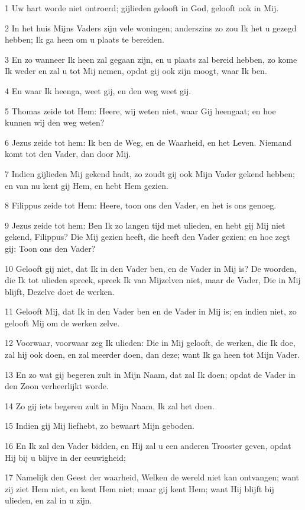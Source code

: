 \par 1 Uw hart worde niet ontroerd; gijlieden gelooft in God, gelooft ook in Mij.
\par 2 In het huis Mijns Vaders zijn vele woningen; anderszins zo zou Ik het u gezegd hebben; Ik ga heen om u plaats te bereiden.
\par 3 En zo wanneer Ik heen zal gegaan zijn, en u plaats zal bereid hebben, zo kome Ik weder en zal u tot Mij nemen, opdat gij ook zijn moogt, waar Ik ben.
\par 4 En waar Ik heenga, weet gij, en den weg weet gij.
\par 5 Thomas zeide tot Hem: Heere, wij weten niet, waar Gij heengaat; en hoe kunnen wij den weg weten?
\par 6 Jezus zeide tot hem: Ik ben de Weg, en de Waarheid, en het Leven. Niemand komt tot den Vader, dan door Mij.
\par 7 Indien gijlieden Mij gekend hadt, zo zoudt gij ook Mijn Vader gekend hebben; en van nu kent gij Hem, en hebt Hem gezien.
\par 8 Filippus zeide tot Hem: Heere, toon ons den Vader, en het is ons genoeg.
\par 9 Jezus zeide tot hem: Ben Ik zo langen tijd met ulieden, en hebt gij Mij niet gekend, Filippus? Die Mij gezien heeft, die heeft den Vader gezien; en hoe zegt gij: Toon ons den Vader?
\par 10 Gelooft gij niet, dat Ik in den Vader ben, en de Vader in Mij is? De woorden, die Ik tot ulieden spreek, spreek Ik van Mijzelven niet, maar de Vader, Die in Mij blijft, Dezelve doet de werken.
\par 11 Gelooft Mij, dat Ik in den Vader ben en de Vader in Mij is; en indien niet, zo gelooft Mij om de werken zelve.
\par 12 Voorwaar, voorwaar zeg Ik ulieden: Die in Mij gelooft, de werken, die Ik doe, zal hij ook doen, en zal meerder doen, dan deze; want Ik ga heen tot Mijn Vader.
\par 13 En zo wat gij begeren zult in Mijn Naam, dat zal Ik doen; opdat de Vader in den Zoon verheerlijkt worde.
\par 14 Zo gij iets begeren zult in Mijn Naam, Ik zal het doen.
\par 15 Indien gij Mij liefhebt, zo bewaart Mijn geboden.
\par 16 En Ik zal den Vader bidden, en Hij zal u een anderen Trooster geven, opdat Hij bij u blijve in der eeuwigheid;
\par 17 Namelijk den Geest der waarheid, Welken de wereld niet kan ontvangen; want zij ziet Hem niet, en kent Hem niet; maar gij kent Hem; want Hij blijft bij ulieden, en zal in u zijn.
